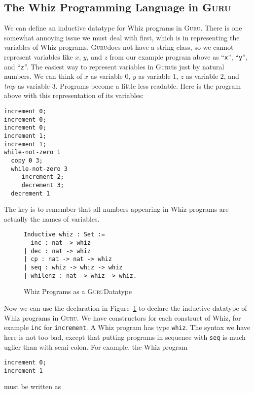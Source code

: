 \documentclass{book}[12pt]
\newcommand{\guru}[0]{\textsc{Guru}}
\begin{document}
\subsection{The Whiz Programming Language in \guru}

We can define an inductive datatype for Whiz programs in \guru.  There
is one somewhat annoying issue we must deal with first, which is in
representing the variables of Whiz programs.  \guru does not have a
string class, so we cannot represent variables like $x$, $y$, and $z$
from our example program above as ``\texttt{x}'', ``\texttt{y}'', and
``\texttt{z}''.  The easiest way to represent variables in \guru is just
by natural numbers.  We can think of $x$ as variable $0$, $y$ as
variable $1$, $z$ as variable $2$, and \textit{tmp} as variable $3$.
Programs become a little less readable.  Here is the program above
with this representation of its variables:

\begin{verbatim}
increment 0;
increment 0;
increment 0;
increment 1;
increment 1;
while-not-zero 1
  copy 0 3;
  while-not-zero 3
     increment 2;
     decrement 3;
  decrement 1
\end{verbatim}

\noindent The key is to remember that all numbers appearing in Whiz
programs are actually the names of variables.

\begin{figure}
\begin{verbatim}
Inductive whiz : Set :=
  inc : nat -> whiz
| dec : nat -> whiz
| cp : nat -> nat -> whiz
| seq : whiz -> whiz -> whiz
| whilenz : nat -> whiz -> whiz.
\end{verbatim}
\caption{\label{fig:whiz}Whiz Programs as a \guru Datatype}
\end{figure}

Now we can use the declaration in Figure~\ref{fig:whiz} to declare the
inductive datatype of Whiz programs in \guru.  We have constructors for
each construct of Whiz, for example \texttt{inc} for
\texttt{increment}.  A Whiz program has type \texttt{whiz}.  The
syntax we have here is not too bad, except that putting programs in
sequence with \texttt{seq} is much uglier than with semi-colon.  For
example, the Whiz program

\begin{verbatim}
increment 0;
increment 1
\end{verbatim}

\noindent must be written as
\end{document}
